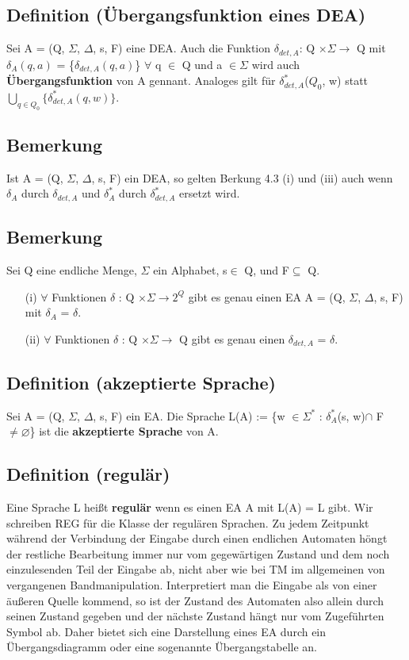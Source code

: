 \documentclass[a4paper,11pt]{article}
\begin{document}
\subsection{Definition (Übergangsfunktion eines DEA)}
Sei A = (Q, $\Sigma$,  $\Delta$, s, F) eine DEA. Auch die Funktion $\delta_{det, A}$: Q $\times \Sigma \rightarrow$ Q mit $\delta_{A}(q,a)$ = \{$\delta_{det, A}(q, a)$\} $\forall$ q $\in$ Q und a $\in \Sigma$ wird auch \textbf{Übergangsfunktion} von A gennant. Analoges gilt für $\delta_{det, A}^{*}$($Q_{0}$, w) statt $\bigcup \limits_{q \in Q_{0}}\{\delta_{det, A}^{*}(q, w)\}$.

\subsection{Bemerkung }
Ist A = (Q, $\Sigma$, $\Delta$, s, F) ein DEA, so gelten Berkung 4.3 (i) und (iii) auch wenn $\delta_{A}$ durch $\delta_{det, A}$ und $\delta_{A}^{*}$ durch $\delta_{det, A}^{*}$ ersetzt wird.

\subsection{Bemerkung}
Sei Q eine endliche Menge, $\Sigma$ ein Alphabet, s$\in$ Q, und F$\subseteq$ Q. 

\begin{itemize}
    \item [(i)] $\forall$ Funktionen $\delta$ : Q $\times \Sigma \rightarrow 2^{Q}$ gibt es genau einen EA A = (Q, $\Sigma$, $\Delta$, s, F) mit $\delta_{A}$ = $\delta$.
    \item [(ii)] $\forall$ Funktionen $\delta$ : Q $\times \Sigma \rightarrow$ Q gibt es genau einen $\delta_{det, A}$ = $\delta$. 
\end{itemize}

\subsection{Definition (akzeptierte Sprache)}
Sei A = (Q, $\Sigma$, $\Delta$, s, F) ein EA. Die Sprache L(A) := \{w $\in \Sigma^{*}$ : $\delta_{A}^{*}$(s, w)$\cap$ F $\neq \varnothing $\} ist die \textbf{akzeptierte Sprache} von A.

\subsection{Definition (regulär)} 
Eine Sprache L heißt \textbf{regulär} wenn es einen EA A mit L(A) = L gibt. Wir schreiben REG für die Klasse der regulären Sprachen. Zu jedem Zeitpunkt während der Verbindung der Eingabe durch einen endlichen Automaten höngt der restliche Bearbeitung immer nur vom gegewärtigen Zustand und dem noch einzulesenden Teil der Eingabe ab, nicht aber wie bei TM im allgemeinen von vergangenen Bandmanipulation. Interpretiert man die Eingabe als von einer äußeren Quelle kommend, so ist der  Zustand des Automaten also allein durch seinen Zustand gegeben und der nächste Zustand hängt nur vom Zugeführten Symbol ab. Daher bietet sich eine Darstellung eines EA durch ein Übergangsdiagramm oder eine sogenannte Übergangstabelle an.
\end{document}
